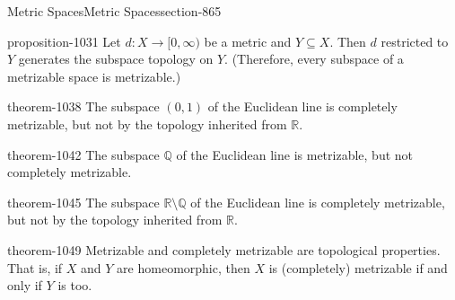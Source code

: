 \documentclass[oneside,10pt,]{article}
\newcommand{\mb}{\mathbb}
\begin{document}
\begin{sectionptx}{Metric Spaces}{}{Metric Spaces}{}{}{section-865}
\begin{proposition}{}{}{proposition-1031}
\hypertarget{p-1032}{}%
Let \(d:X\to[0,\infty)\) be a metric and \(Y\subseteq X\). Then \(d\) restricted to \(Y\) generates the subspace topology on \(Y\). (Therefore, every subspace of a metrizable space is metrizable.)%
\end{proposition}
\begin{theorem}{}{}{theorem-1038}%
\hypertarget{p-1039}{}%
The subspace \((0,1)\) of the Euclidean line is completely metrizable, but not by the topology inherited from \(\mb R\).%
\end{theorem}
\begin{theorem}{}{}{theorem-1042}%
\hypertarget{p-1043}{}%
The subspace \(\mb Q\) of the Euclidean line is metrizable, but not completely metrizable.%
\end{theorem}
\begin{theorem}{}{}{theorem-1045}%
\hypertarget{p-1046}{}%
The subspace \(\mb R\setminus\mb Q\) of the Euclidean line is completely metrizable, but not by the topology inherited from \(\mb R\).%
\end{theorem}
\begin{theorem}{}{}{theorem-1049}%
\hypertarget{p-1050}{}%
Metrizable and completely metrizable are topological properties. That is, if \(X\) and \(Y\) are homeomorphic, then \(X\) is (completely) metrizable if and only if \(Y\) is too.%
\end{theorem}
\end{sectionptx}
%
%
\typeout{************************************************}
\typeout{************************************************}
%
\end{document}

